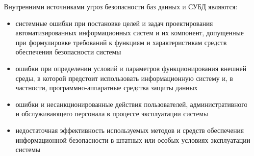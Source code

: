 Внутренними источниками угроз безопасности баз данных и СУБД являются:
\begin{itemize}
	\item системные ошибки при постановке целей и задач проектирования автоматизированных информационных систем и их компонент, допущенные при формулировке требований к функциям и характеристикам средств обеспечения безопасности системы
	\item ошибки при определении условий и параметров функционирования внешней среды, в которой предстоит использовать информационную систему и, в частности, программно-аппаратные средства защиты данных
	\item ошибки и несанкционированные действия пользователей, административного и обслуживающего персонала в процессе эксплуатации системы
	\item недостаточная эффективность используемых методов и средств обеспечения информационной безопасности в штатных или особых условиях эксплуатации системы
\end{itemize}

